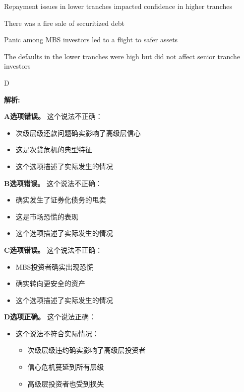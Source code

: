 \documentclass{article}
\newenvironment{explanation}
{\textbf{解析:}\par}
{\par}
\begin{document}
\begin{choices}
    \item Repayment issues in lower tranches impacted confidence in higher tranches
    \item There was a fire sale of securitized debt
    \item Panic among MBS investors led to a flight to safer assets
    \item The defaults in the lower tranches were high but did not affect senior tranche investors
\end{choices}

\begin{correctanswer}
    D
\end{correctanswer}

\begin{explanation}
    \textbf{A选项错误。}
    这个说法不正确：
    \begin{itemize}
        \item 次级层级还款问题确实影响了高级层信心
        \item 这是次贷危机的典型特征
        \item 这个选项描述了实际发生的情况
    \end{itemize}

    \textbf{B选项错误。}
    这个说法不正确：
    \begin{itemize}
        \item 确实发生了证券化债务的甩卖
        \item 这是市场恐慌的表现
        \item 这个选项描述了实际发生的情况
    \end{itemize}

    \textbf{C选项错误。}
    这个说法不正确：
    \begin{itemize}
        \item MBS投资者确实出现恐慌
        \item 确实转向更安全的资产
        \item 这个选项描述了实际发生的情况
    \end{itemize}

    \textbf{D选项正确。}
    这个说法正确：
    \begin{itemize}
        \item 这个说法不符合实际情况：
        \begin{itemize}
            \item 次级层级违约确实影响了高级层投资者
            \item 信心危机蔓延到所有层级
            \item 高级层投资者也受到损失
        \end{itemize}
    \end{itemize}
\end{explanation}
\end{document}
